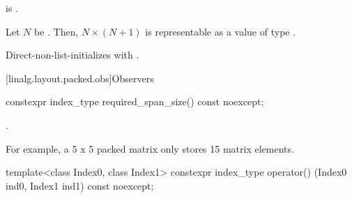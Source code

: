 \begin{itemdescr}
\pnum
\constraints
{} is .

\pnum
\expects
Let $N$ be .
Then, $N \times (N+1)$ is representable as
a value of type .

\pnum
\effects
Direct-non-list-initializes  with .
\end{itemdescr}

[linalg.layout.packed.obs]{Observers}

\begin{itemdecl}
constexpr index_type required_span_size() const noexcept;
\end{itemdecl}

\begin{itemdescr}
\pnum
\returns
{}.
\begin{note}
For example, a 5 x 5 packed matrix
only stores 15 matrix elements.
\end{note}
\end{itemdescr}

\begin{itemdecl}
template<class Index0, class Index1>
  constexpr index_type operator() (Index0 ind0, Index1 ind1) const noexcept;
\end{itemdecl}

